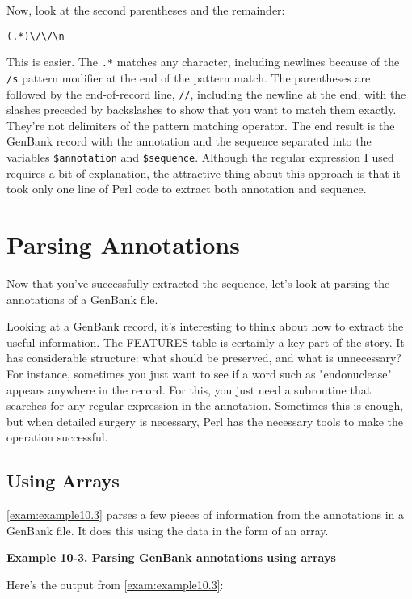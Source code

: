 Now, look at the second parentheses and the remainder:

\begin{lstlisting}
(.*)\/\/\n
\end{lstlisting}

This is easier. The \verb|.*| matches any character, including newlines because of the \verb|/s| pattern modifier at the end of the pattern match. The parentheses are followed by the end-of-record line, \verb|//|, including the newline at the end, with the slashes preceded by backslashes to show that you want to match them exactly. They're not delimiters of the pattern matching operator. The end result is the GenBank record with the annotation and the sequence separated into the variables \verb|$annotation| and \verb|$sequence|. Although the regular expression I used requires a bit of explanation, the attractive thing about this approach is that it took only one line of Perl code to extract both annotation and sequence. 

\section{Parsing Annotations}
Now that you've successfully extracted the sequence, let's look at parsing the annotations of a GenBank file.

Looking at a GenBank record, it's interesting to think about how to extract the useful information. The FEATURES table is certainly a key part of the story. It has considerable structure: what should be preserved, and what is unnecessary? For instance, sometimes you just want to see if a word such as "endonuclease" appears anywhere in the record. For this, you just need a subroutine that searches for any regular expression in the annotation. Sometimes this is enough, but when detailed surgery is necessary, Perl has the necessary tools to make the operation successful. 

\subsection{Using Arrays}
\autoref{exam:example10.3} parses a few pieces of information from the annotations in a GenBank file. It does this using the data in the form of an array. 
  
\textbf{Example 10-3. Parsing GenBank annotations using arrays}


Here's the output from \autoref{exam:example10.3}:

